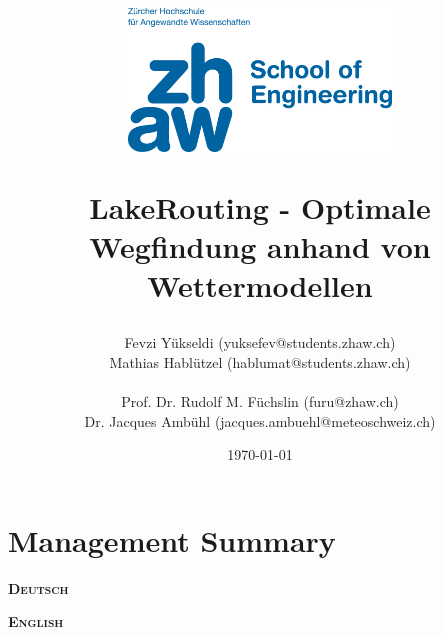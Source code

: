 \documentclass[a4paper,10pt]{article}
\begin{document}
 

\pagestyle{fancy} %
\fancyhf{} %
\renewcommand{\headrulewidth}{0.4pt} 
\fancyfoot[C]{\thepage}

 \title{\begin{flushleft}\vspace*{-3cm}\includegraphics[keepaspectratio,width=7cm]{img/de-zhaw-cmyk}\end{flushleft} \vspace*{4cm} LakeRouting - Optimale Wegfindung anhand von Wettermodellen }
 \date{\today}
 \author{Fevzi Yükseldi (yuksefev@students.zhaw.ch)\\
 Mathias Hablützel (hablumat@students.zhaw.ch)\\
 \\
Prof. Dr. Rudolf M. Füchslin (furu@zhaw.ch)\\
Dr. Jacques Ambühl (jacques.ambuehl@meteoschweiz.ch)}
 
 \maketitle
\thispagestyle{empty}
 \newpage
\thispagestyle{empty}
\part*{Management Summary}

\vspace*{2cm}
\setlength{\columnsep}{2cm}
\begin{multicols}{2}

\textbf{\textsc{Deutsch}}
\vspace{1cm}\\

\columnbreak

\textbf{\textsc{English}}
\vspace{1cm}\\

\end{multicols}
\newpage
\end{document}
